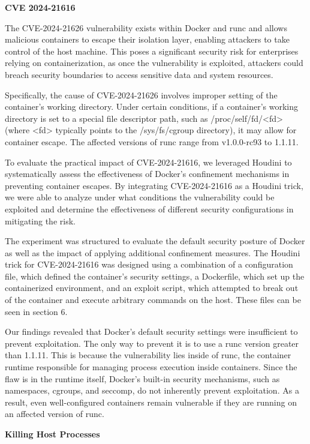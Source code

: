 \noindent\textbf{CVE 2024-21616}


The CVE-2024-21626 vulnerability exists within Docker and runc and allows malicious containers to escape their isolation layer, enabling attackers to take control of the host machine. This poses a significant security risk for enterprises relying on containerization, as once the vulnerability is exploited, attackers could breach security boundaries to access sensitive data and system resources. 

Specifically, the cause of CVE-2024-21626 involves improper setting of the container’s working directory. Under certain conditions, if a container's working directory is set to a special file descriptor path, such as /proc/self/fd/<fd> (where <fd> typically points to the /sys/fs/cgroup directory), it may allow for container escape. The affected versions of runc range from v1.0.0-rc93 to 1.1.11.

To evaluate the practical impact of CVE-2024-21616, we leveraged Houdini to systematically assess the effectiveness of Docker’s confinement mechanisms in preventing container escapes. By integrating CVE-2024-21616 as a Houdini trick, we were able to analyze under what conditions the vulnerability could be exploited and determine the effectiveness of different security configurations in mitigating the risk.

The experiment was structured to evaluate the default security posture of Docker as well as the impact of applying additional confinement measures. The Houdini trick for CVE-2024-21616 was designed using a combination of a configuration file, which defined the container’s security settings, a Dockerfile, which set up the containerized environment, and an exploit script, which attempted to break out of the container and execute arbitrary commands on the host. These files can be seen in section 6.

Our findings revealed that Docker’s default security settings were insufficient to prevent exploitation. The only way to prevent it is to use a runc version greater than 1.1.11. This is because the vulnerability lies inside of runc, the container runtime responsible for managing process execution inside containers. Since the flaw is in the runtime itself, Docker’s built-in security mechanisms, such as namespaces, cgroups, and seccomp, do not inherently prevent exploitation. As a result, even well-configured containers remain vulnerable if they are running on an affected version of runc.


\noindent\textbf{Killing Host Processes}

